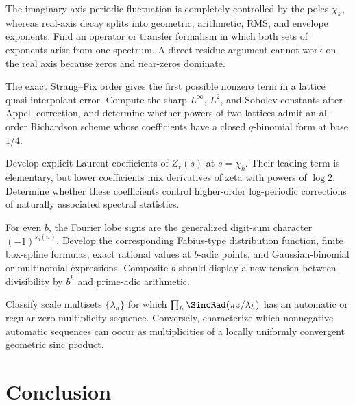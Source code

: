 \documentclass[11pt]{article}
\numberwithin{equation}{section}
\theoremstyle{definition}
\theoremstyle{remark}
\begin{document}
\begin{problem}
The imaginary-axis periodic fluctuation is completely controlled by the poles
$\chi_k$, whereas real-axis decay splits into geometric, arithmetic, RMS, and
envelope exponents.  Find an operator or transfer formalism in which both sets of
exponents arise from one spectrum.  A direct residue argument cannot work on the
real axis because zeros and near-zeros dominate.
\end{problem}

\begin{problem}
The exact Strang--Fix order gives the first possible nonzero term in a lattice
quasi-interpolant error.  Compute the sharp $L^\infty$, $L^2$, and Sobolev
constants after Appell correction, and determine whether powers-of-two lattices
admit an all-order Richardson scheme whose coefficients have a closed
$q$-binomial form at base $1/4$.
\end{problem}

\begin{problem}
Develop explicit Laurent coefficients of $Z_r(s)$ at $s=\chi_k$.  Their leading
term is elementary, but lower coefficients mix derivatives of zeta with powers
of $\log2$.  Determine whether these coefficients control higher-order
log-periodic corrections of naturally associated spectral statistics.
\end{problem}

\begin{problem}
For even $b$, the Fourier lobe signs are the generalized digit-sum character
$(-1)^{s_b(n)}$.  Develop the corresponding Fabius-type distribution function,
finite box-spline formulas, exact rational values at $b$-adic points, and
Gaussian-binomial or multinomial expressions.  Composite $b$ should display a
new tension between divisibility by $b^h$ and prime-adic arithmetic.
\end{problem}

\begin{problem}
Classify scale multisets $\{\lambda_h\}$ for which
$\prod_h\SincRad(\pi z/\lambda_h)$ has an automatic or regular zero-multiplicity
sequence.  Conversely, characterize which nonnegative automatic sequences can
occur as multiplicities of a locally uniformly convergent geometric sinc
product.
\end{problem}

\section{Conclusion}
\end{document}
